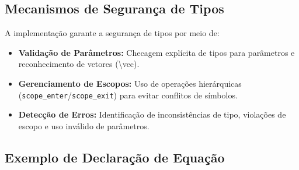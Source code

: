 \subsection*{Mecanismos de Segurança de Tipos}

A implementação garante a segurança de tipos por meio de:
\begin{itemize}
  \item \textbf{Validação de Parâmetros:}
  Checagem explícita de tipos para parâmetros e reconhecimento de vetores (\textbackslash{}vec).

  \item \textbf{Gerenciamento de Escopos:}
  Uso de operações hierárquicas (\texttt{scope\_enter}/\texttt{scope\_exit}) para evitar conflitos de símbolos.

  \item \textbf{Detecção de Erros:}
  Identificação de inconsistências de tipo, violações de escopo e uso inválido de parâmetros.
\end{itemize}

\subsection*{Exemplo de Declaração de Equação}
